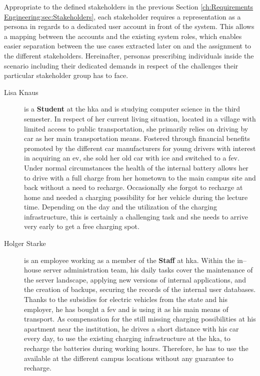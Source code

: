 Appropriate to the defined stakeholders in the previous Section \ref{ch:Requirements Engineering:sec:Stakeholders}, each stakeholder requires a representation as a persona in regards to a dedicated user account in front of the system.
This allows a mapping between the accounts and the existing system roles, which enables easier separation between the use cases extracted later on and the assignment to the different stakeholders. 
Hereinafter, personas prescribing individuals inside the scenario including their dedicated demands in respect of the challenges their particular stakeholder group has to face. 

\begin{description}
    \item[Lisa Knaus] is a \textbf{Student} at the \acrshort{hka} and is studying computer science in the third semester. In respect of her current living situation, located in a village with limited access to public transportation, she primarily relies on driving by car as her main transportation means. 
    Fostered through financial benefits promoted by the different car manufacturers for young drivers with interest in acquiring an \acrshort{ev}, she sold her old car with \acrshort{ice} and switched to a \acrfull{fev}. 
    Under normal circumstances the health of the internal battery allows her to drive with a full charge from her hometown to the main campus site and back without a need to recharge. Occasionally she forgot to recharge at home and needed a charging possibility for her vehicle during the lecture time. Depending on the day and the utilization of the charging infrastructure, this is certainly a challenging task and she needs to arrive very early to get a free charging spot. 
    \item[Holger Starke] is an employee working as a member of the \textbf{Staff} at \acrshort{hka}. 
    Within the in--house server administration team, his daily tasks cover the maintenance of the server landscape, applying new versions of internal applications, and the creation of backups, securing the records of the internal user databases. 
    Thanks to the subsidies for electric vehicles from the state and his employer, he has bought a \acrshort{fev} and is using it as his main means of transport. 
    As compensation for the still missing charging possibilities at his apartment near the institution, he drives a short distance with his car every day, to use the existing charging infrastructure at the \acrshort{hka}, to recharge the batteries during working hours. 
    Therefore, he has to use the available  at the different campus locations without any guarantee to recharge. 

\end{description}
